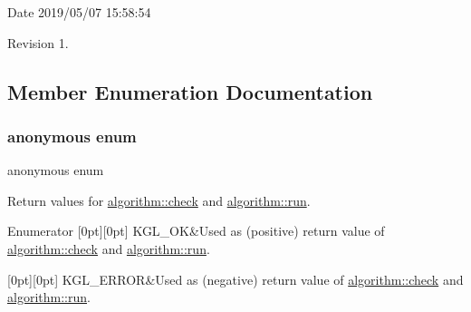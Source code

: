 \begin{DoxyParagraph}{Date}
2019/05/07 15\+:58\+:54 
\end{DoxyParagraph}
\begin{DoxyParagraph}{Revision}
1. 
\end{DoxyParagraph}


\subsection{Member Enumeration Documentation}
\mbox{\label{classalgorithm_af1a0078e153aa99c24f9bdf0d97f6710}} 
\subsubsection{\texorpdfstring{anonymous enum}{anonymous enum}}
{\footnotesize\ttfamily anonymous enum}



Return values for \mbox{\hyperlink{classalgorithm_a05c0f25463eb35a77b2d73fc06bb2c0e}{algorithm\+::check}} and \mbox{\hyperlink{classalgorithm_a482eb28cacba018b5a86d3a819a50a2f}{algorithm\+::run}}. 

\begin{DoxyEnumFields}{Enumerator}
[0pt][0pt]{}\mbox{\label{classalgorithm_af1a0078e153aa99c24f9bdf0d97f6710aae4c1cd7fe8d8cf4b143241a6e7c31cf}} 
K\+G\+L\+\_\+\+OK&Used as (positive) return value of \mbox{\hyperlink{classalgorithm_a05c0f25463eb35a77b2d73fc06bb2c0e}{algorithm\+::check}} and \mbox{\hyperlink{classalgorithm_a482eb28cacba018b5a86d3a819a50a2f}{algorithm\+::run}}. \\
\hline

[0pt][0pt]{}\mbox{\label{classalgorithm_af1a0078e153aa99c24f9bdf0d97f6710ae67bf27b2ef31f73e545a7f9f4a69556}} 
K\+G\+L\+\_\+\+E\+R\+R\+OR&Used as (negative) return value of \mbox{\hyperlink{classalgorithm_a05c0f25463eb35a77b2d73fc06bb2c0e}{algorithm\+::check}} and \mbox{\hyperlink{classalgorithm_a482eb28cacba018b5a86d3a819a50a2f}{algorithm\+::run}}. \\
\hline

\end{DoxyEnumFields}


